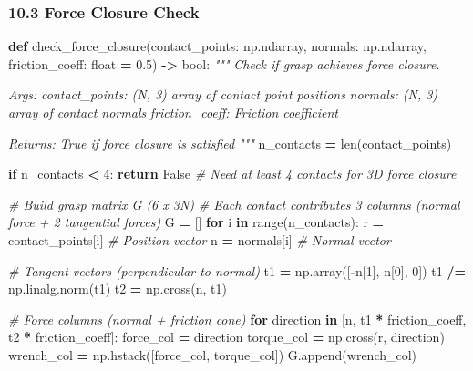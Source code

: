 \documentclass[
]{article}
\newenvironment{Shaded}{\begin{snugshade}}{\end{snugshade}}
\newcommand{\BuiltInTok}[1]{#1}
\newcommand{\CommentTok}[1]{\textcolor[rgb]{0.56,0.35,0.01}{\textit{#1}}}
\newcommand{\ControlFlowTok}[1]{\textcolor[rgb]{0.13,0.29,0.53}{\textbf{#1}}}
\newcommand{\DecValTok}[1]{\textcolor[rgb]{0.00,0.00,0.81}{#1}}
\newcommand{\FloatTok}[1]{\textcolor[rgb]{0.00,0.00,0.81}{#1}}
\newcommand{\KeywordTok}[1]{\textcolor[rgb]{0.13,0.29,0.53}{\textbf{#1}}}
\newcommand{\NormalTok}[1]{#1}
\newcommand{\OperatorTok}[1]{\textcolor[rgb]{0.81,0.36,0.00}{\textbf{#1}}}
\newcommand{\VariableTok}[1]{\textcolor[rgb]{0.00,0.00,0.00}{#1}}
\begin{document}
\hypertarget{force-closure-check}{%
\subsubsection{10.3 Force Closure Check}\label{force-closure-check}}

\begin{Shaded}
\begin{Highlighting}[]
\KeywordTok{def}\NormalTok{ check\_force\_closure(contact\_points: np.ndarray,}
\NormalTok{                        normals: np.ndarray,}
\NormalTok{                        friction\_coeff: }\BuiltInTok{float} \OperatorTok{=} \FloatTok{0.5}\NormalTok{) }\OperatorTok{{-}\textgreater{}} \BuiltInTok{bool}\NormalTok{:}
    \CommentTok{"""}
\CommentTok{    Check if grasp achieves force closure.}

\CommentTok{    Args:}
\CommentTok{        contact\_points: (N, 3) array of contact point positions}
\CommentTok{        normals: (N, 3) array of contact normals}
\CommentTok{        friction\_coeff: Friction coefficient}

\CommentTok{    Returns:}
\CommentTok{        True if force closure is satisfied}
\CommentTok{    """}
\NormalTok{    n\_contacts }\OperatorTok{=} \BuiltInTok{len}\NormalTok{(contact\_points)}

    \ControlFlowTok{if}\NormalTok{ n\_contacts }\OperatorTok{\textless{}} \DecValTok{4}\NormalTok{:}
        \ControlFlowTok{return} \VariableTok{False}  \CommentTok{\# Need at least 4 contacts for 3D force closure}

    \CommentTok{\# Build grasp matrix G (6 x 3N)}
    \CommentTok{\# Each contact contributes 3 columns (normal force + 2 tangential forces)}
\NormalTok{    G }\OperatorTok{=}\NormalTok{ []}
    \ControlFlowTok{for}\NormalTok{ i }\KeywordTok{in} \BuiltInTok{range}\NormalTok{(n\_contacts):}
\NormalTok{        r }\OperatorTok{=}\NormalTok{ contact\_points[i]  }\CommentTok{\# Position vector}
\NormalTok{        n }\OperatorTok{=}\NormalTok{ normals[i]         }\CommentTok{\# Normal vector}

        \CommentTok{\# Tangent vectors (perpendicular to normal)}
\NormalTok{        t1 }\OperatorTok{=}\NormalTok{ np.array([}\OperatorTok{{-}}\NormalTok{n[}\DecValTok{1}\NormalTok{], n[}\DecValTok{0}\NormalTok{], }\DecValTok{0}\NormalTok{])}
\NormalTok{        t1 }\OperatorTok{/=}\NormalTok{ np.linalg.norm(t1)}
\NormalTok{        t2 }\OperatorTok{=}\NormalTok{ np.cross(n, t1)}

        \CommentTok{\# Force columns (normal + friction cone)}
        \ControlFlowTok{for}\NormalTok{ direction }\KeywordTok{in}\NormalTok{ [n, t1 }\OperatorTok{*}\NormalTok{ friction\_coeff, t2 }\OperatorTok{*}\NormalTok{ friction\_coeff]:}
\NormalTok{            force\_col }\OperatorTok{=}\NormalTok{ direction}
\NormalTok{            torque\_col }\OperatorTok{=}\NormalTok{ np.cross(r, direction)}
\NormalTok{            wrench\_col }\OperatorTok{=}\NormalTok{ np.hstack([force\_col, torque\_col])}
\NormalTok{            G.append(wrench\_col)}


\end{Highlighting}
\end{Shaded}
\end{document}
